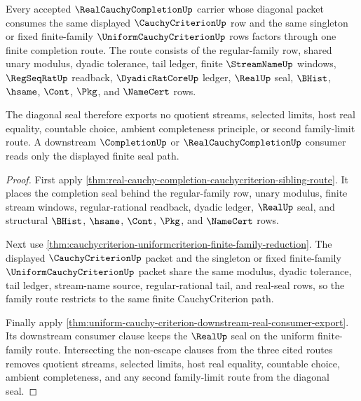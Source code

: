 \begin{theorem}
\label{thm:real-cauchy-completion-diagonal-seal-uniformity}
Every accepted $\RealCauchyCompletionUp$ carrier whose diagonal packet consumes the same displayed $\CauchyCriterionUp$ row and the same singleton or fixed finite-family $\UniformCauchyCriterionUp$ rows factors through one finite completion route. The route consists of the regular-family row, shared unary modulus, dyadic tolerance, tail ledger, finite $\StreamNameUp$ windows, $\RegSeqRatUp$ readback, $\DyadicRatCoreUp$ ledger, $\RealUp$ seal, $\BHist$, $\hsame$, $\Cont$, $\Pkg$, and $\NameCert$ rows.

The diagonal seal therefore exports no quotient streams, selected limits, host real equality, countable choice, ambient completeness principle, or second family-limit route. A downstream $\CompletionUp$ or $\RealCauchyCompletionUp$ consumer reads only the displayed finite seal path.
\end{theorem}
\begin{proof}
First apply \autoref{thm:real-cauchy-completion-cauchycriterion-sibling-route}. It places the completion seal behind the regular-family row, unary modulus, finite stream windows, regular-rational readback, dyadic ledger, $\RealUp$ seal, and structural $\BHist$, $\hsame$, $\Cont$, $\Pkg$, and $\NameCert$ rows.

Next use \autoref{thm:cauchycriterion-uniformcriterion-finite-family-reduction}. The displayed $\CauchyCriterionUp$ packet and the singleton or fixed finite-family $\UniformCauchyCriterionUp$ packet share the same modulus, dyadic tolerance, tail ledger, stream-name source, regular-rational tail, and real-seal rows, so the family route restricts to the same finite CauchyCriterion path.

Finally apply \autoref{thm:uniform-cauchy-criterion-downstream-real-consumer-export}. Its downstream consumer clause keeps the $\RealUp$ seal on the uniform finite-family route. Intersecting the non-escape clauses from the three cited routes removes quotient streams, selected limits, host real equality, countable choice, ambient completeness, and any second family-limit route from the diagonal seal.
\end{proof}

